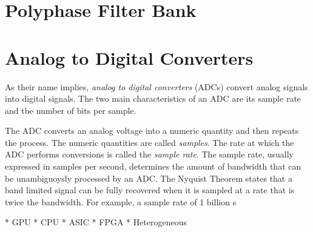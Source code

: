 \documentclass{article}
\begin{document}
\section{Polyphase Filter Bank}

\section{Analog to Digital
Converters}\label{analog-to-digital-converters}

As their name implies, \emph{analog to digital converters} (ADCs)
convert analog signals into digital signals. The two main
characteristics of an ADC are its sample rate and tbe number of bits per
sample.

The ADC converts an analog voltage into a numeric quantity and then
repeats the process. The numeric quantities are called \emph{samples}.
The rate at which the ADC performs conversions is called the
\emph{sample rate}. The sample rate, usually expressed in samples per
second, determines the amount of bandwidth that can be unambiguoysly
processed by an ADC. The Nyquist Theorem states that a band limited
signal can be fully recovered when it is sampled at a rate that is twice
the bandwidth. For example, a sample rate of 1 billion s











    * GPU
    * CPU
    * ASIC
    * FPGA
    * Heterogeneous











%
\end{document}
